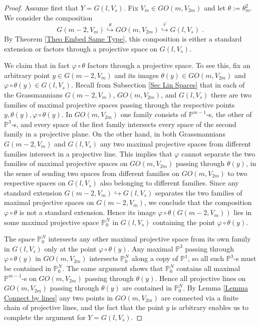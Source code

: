 \documentclass[12pt]{amsart}
\def\PP {{\mathbb P}}     %
\begin{document}
\begin{proof}
Assume first that $Y=G(l,V_s)$. Fix $V_m\in GO(m,V_{2m})$ and let $\theta:=\theta_m^2$. We consider the composition
$$
G(m-2,V_m) \stackrel{\theta}{\hookrightarrow} GO(m,V_{2m}) \stackrel{\varphi}{\hookrightarrow} G(l,V_s) \;.
$$
By Theorem \ref{Theo Embed Same Type}, this composition is either a standard extension or factors through a projective space on $G(l,V_s)$.

We claim that in fact $\varphi\circ\theta$ factors through a projective space. To see this, fix an arbitrary point $y\in G(m-2,V_m)$ and its images $\theta(y)\in GO(m,V_{2m})$ and $\varphi\circ \theta(y)\in G(l,V_s)$. Recall from Subsection \ref{Sec Lin Spaces} that in each of the Grassmannians $G(m-2,V_m)$, $GO(m,V_{2m})$, and $G(l,V_s)$ there are two families of maximal projective spaces passing through the respective points $y, \theta(y), \varphi\circ \theta(y)$. In $GO(m,V_{2m})$ one family consists of $\PP^{m-1}$-s, the other of $\PP^3$-s, and every space of the first family intersects every space of the second family in a projective plane. On the other hand, in both Grassmannians $G(m-2,V_m)$ and $G(l,V_s)$ any two maximal projective spaces from different families intersect in a projective line. This implies that $\varphi$ cannot separate the two families of maximal projective spaces on $GO(m,V_{2m})$ passing through $\theta(y)$, in the sense of sending two spaces from different families on $GO(m,V_{2m})$ to two respective spaces on $G(l,V_s)$ also belonging to different families. Since any standard extension $G(m-2,V_m)\hookrightarrow G(l,V_s)$ separates the two families of maximal projective spaces on $G(m-2,V_m)$, we conclude that the composition $\varphi\circ\theta$ is not a standard extension. Hence its image $\varphi\circ\theta(G(m-2,V_m))$ lies in some maximal projective space $\PP_0^N$ in $G(l,V_s)$ containing the point $\varphi\circ\theta(y)$. 

The space $\PP_0^N$ intersects any other maximal projective space from its own family in $G(l,V_s)$ only at the point $\varphi\circ \theta(y)$. Any maximal $\PP^3$ passing through $\varphi\circ \theta(y)$ in $GO(m,V_{2m})$ intersects $\PP_0^N$ along a copy of $\PP^1$, so all such $\PP^3$-s must be contained in $\PP_0^N$. The same argument shows that $\PP_0^N$ contains all maximal $\PP^{m-1}$-s on $GO(m,V_{2m})$ passing through $\theta(y)$. Hence all projective lines on $GO(m,V_{2m})$ passing through $\theta(y)$ are contained in $\PP_0^N$. By Lemma \ref{Lemma Connect by lines} any two points in $GO(m,V_{2m})$ are connected via a finite chain of projective lines, and the fact that the point $y$ is arbitrary enables us to complete the argument for $Y= G(l,V_s)$.


\end{proof}
\end{document}

